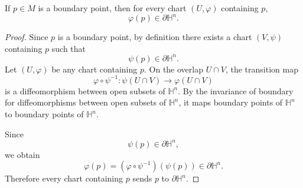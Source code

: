 \begin{lemma}
If $p\in M$ is a boundary point, then for every chart $(U,\varphi)$ containing $p$,
\[
  \varphi(p)\in \partial\mathbb H^n.
\]
\end{lemma}

\begin{proof}
Since $p$ is a boundary point, by definition there exists a chart $(V,\psi)$
containing $p$ such that
\[
  \psi(p)\in \partial\mathbb H^n.
\]
Let $(U,\varphi)$ be any chart containing $p$. On the overlap $U\cap V$, the
transition map
\[
  \varphi\circ\psi^{-1}:
  \psi(U\cap V)\to \varphi(U\cap V)
\]
is a diffeomorphism between open subsets of $\mathbb H^n$. By the invariance
of boundary for diffeomorphisms between open subsets of $\mathbb H^n$, it maps
boundary points of $\mathbb H^n$ to boundary points of $\mathbb H^n$.

Since
\[
  \psi(p)\in \partial\mathbb H^n,
\]
we obtain
\[
  \varphi(p)
  =
  (\varphi\circ\psi^{-1})(\psi(p))
  \in \partial\mathbb H^n.
\]
Therefore every chart containing $p$ sends $p$ to $\partial\mathbb H^n$.
\end{proof}
